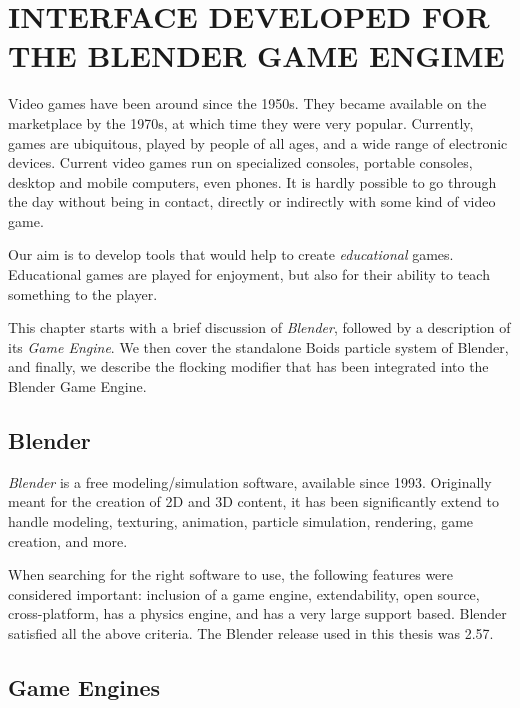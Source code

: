 \chapter{INTERFACE DEVELOPED FOR THE BLENDER GAME ENGIME}\label{chap5}


Video games have been around since the 1950s\cite{historyVideoGames}. They became available on the marketplace by the 1970s, at which time they were very popular. Currently, games are ubiquitous, played by people of all ages, and a wide range of electronic devices. Current video games run on specialized consoles, portable consoles, desktop and mobile computers, even phones. It is hardly possible to go through the day without being in contact, directly or indirectly with some kind of video game.

Our aim is to develop tools that would help to create \textit{educational} games. Educational games are played for enjoyment, but also for their ability to teach something to the player. 

This chapter starts with a brief discussion of \textit{Blender}, followed by a description of its \textit{Game Engine}. We then cover the standalone Boids particle system of Blender, and finally, we describe the flocking modifier that has been integrated into the Blender Game Engine. 


\section{Blender}\label{blenderSec}
\textit{Blender}\cite{blenderWeb} is a free modeling/simulation software, available since 1993. Originally meant for the creation of 2D and 3D content, it has been significantly extend to handle modeling, texturing, animation, particle simulation, rendering, game creation, and more. 

When searching for the right software to use, the following features were considered important: inclusion of a game engine, extendability, open source, cross-platform, has a physics engine, and has a very large support based. Blender satisfied all the above criteria. The Blender release used in this thesis was 2.57.

\section{Game Engines}

